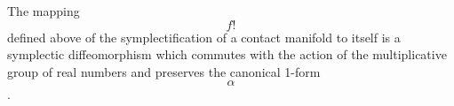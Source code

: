 The mapping $$f!$$ defined above of the symplectification of a contact manifold to itself is a symplectic diffeomorphism which commutes with the action of the multiplicative group of real numbers and preserves the canonical 1-form $$\alpha$$.
